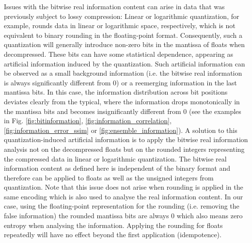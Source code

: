 Issues with the bitwise real information content can arise in data that was previously subject to lossy compression:
Linear or logarithmic quantization, for example, rounds data in linear or logarithmic space, respectively, which is not
equivalent to binary rounding in the floating-point format. Consequently, such a quantization will generally introduce
non-zero bits in the mantissa of floats when decompressed. These bits can have some statistical dependence,
appearing as artificial information induced by the quantization. Such artificial information can be observed as a
small background information (i.e. the bitwise real information is always significantly different from 0) or a reemerging
information in the last mantissa bits. In this case, the information distribution across bit positions deviates clearly from
the typical, where the information drops monotonically in the mantissa bits and becomes insignificantly different from
0 (see the examples in Fig. \ref{fig:bitinformation}, \ref{fig:information_correlation}, \ref{fig:information_error_ssim} or
\ref{fig:ensemble_information}). A solution to this quantization-induced artificial information is to apply the bitwise real
information analysis not on the decompressed floats but on the rounded integers representing the compressed data
in linear or logarithmic quantization. The bitwise real information content as defined here is independent of the binary
format and therefore can be applied to floats as well as the unsigned integers from quantization. Note that this issue
does not arise when rounding is applied in the same encoding which is also used to analyse the real information content.
In our case, using the floating-point representation for the rounding (i.e. removing the false information) the rounded
mantissa bits are always 0 which also means zero entropy when analysing the information. Applying the rounding for
floats repeatedly will have no effect beyond the first application (idempotence).

